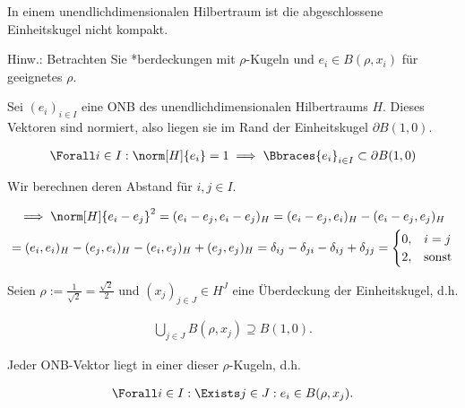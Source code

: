 
\begin{exercise}

In einem unendlichdimensionalen Hilbertraum ist die abgeschlossene Einheitskugel nicht kompakt.

Hinw.:
Betrachten Sie *berdeckungen mit $\rho$-Kugeln und $e_i \in B(\rho, x_i)$ für geeignetes $\rho$.

\end{exercise}


\begin{solution}

Sei $(e_i)_{i \in I}$ eine ONB des unendlichdimensionalen Hilbertraums $H$.
Dieses Vektoren sind normiert, also liegen sie im Rand der Einheitskugel $\partial B(1, 0)$.

\begin{align*}
    \Forall i \in I:
    \norm[H]{e_i} = 1
    \implies
    \Bbraces{e_i}_{i \in I} \subset \partial B(1, 0)
\end{align*}

Wir berechnen deren Abstand für $i, j \in I$.

\begin{multline*}
    \implies
    \norm[H]{e_i - e_j}^2
    =
    (e_i - e_j, e_i - e_j)_H
    =
    (e_i - e_j, e_i)_H - (e_i - e_j, e_j)_H \\
    =
    (e_i, e_i)_H - (e_j, e_i)_H - (e_i, e_j)_H + (e_j, e_j)_H
    =
    \delta_{ij} - \delta_{ji} - \delta_{ij} + \delta_{jj}
    =
    \begin{cases}
        0, & i = j \\
        2, & \text{sonst}
    \end{cases}
\end{multline*}

Seien $\rho := \frac{1}{\sqrt 2} = \frac{\sqrt 2}{2}$ und $(x_j)_{j \in J} \in H^J$ eine Überdeckung der Einheitskugel, d.h.

\begin{align*}
    \bigcup_{j \in J} B(\rho, x_j) \supseteq B(1, 0).
\end{align*}

Jeder ONB-Vektor liegt in einer dieser $\rho$-Kugeln, d.h.

\begin{align*}
    \Forall i \in I:
    \Exists j \in J:
    e_i \in B(\rho, x_j).
\end{align*}


\end{solution}
